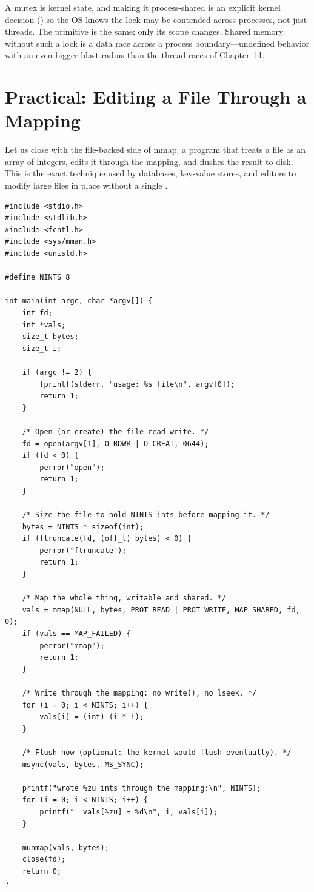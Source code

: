 \begin{osconcept}
A mutex is kernel state, and making it process-shared is an explicit
kernel decision () so the OS knows the
lock may be contended across processes, not just threads. The
primitive is the same; only its scope changes. Shared memory without
such a lock is a data race across a process boundary---undefined
behavior with an even bigger blast radius than the thread races of
Chapter~11.
\end{osconcept}

\section{Practical: Editing a File Through a Mapping}

Let us close with the file-backed side of mmap: a program that treats
a file as an array of integers, edits it through the mapping, and
flushes the result to disk. This is the exact technique used by
databases, key-value stores, and editors to modify large files in
place without a single .

\begin{lstlisting}[caption={mmapfile.c: the file as an array of ints.}]
#include <stdio.h>
#include <stdlib.h>
#include <fcntl.h>
#include <sys/mman.h>
#include <unistd.h>

#define NINTS 8

int main(int argc, char *argv[]) {
    int fd;
    int *vals;
    size_t bytes;
    size_t i;

    if (argc != 2) {
        fprintf(stderr, "usage: %s file\n", argv[0]);
        return 1;
    }

    /* Open (or create) the file read-write. */
    fd = open(argv[1], O_RDWR | O_CREAT, 0644);
    if (fd < 0) {
        perror("open");
        return 1;
    }

    /* Size the file to hold NINTS ints before mapping it. */
    bytes = NINTS * sizeof(int);
    if (ftruncate(fd, (off_t) bytes) < 0) {
        perror("ftruncate");
        return 1;
    }

    /* Map the whole thing, writable and shared. */
    vals = mmap(NULL, bytes, PROT_READ | PROT_WRITE, MAP_SHARED, fd, 0);
    if (vals == MAP_FAILED) {
        perror("mmap");
        return 1;
    }

    /* Write through the mapping: no write(), no lseek. */
    for (i = 0; i < NINTS; i++) {
        vals[i] = (int) (i * i);
    }

    /* Flush now (optional: the kernel would flush eventually). */
    msync(vals, bytes, MS_SYNC);

    printf("wrote %zu ints through the mapping:\n", NINTS);
    for (i = 0; i < NINTS; i++) {
        printf("  vals[%zu] = %d\n", i, vals[i]);
    }

    munmap(vals, bytes);
    close(fd);
    return 0;
}
\end{lstlisting}

